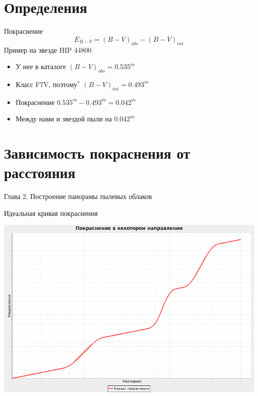 \documentclass[14pt, fleqn, xcolor={dvipsnames, table}]{beamer}
\begin{document}
    \section{Определения}
        \begin{frame}{Покраснение}
            $$
                E_{B - V} = (B - V)_{obs} - (B - V)_{int}
            $$
            Пример на звезде HIP 44800
            \begin{itemize}
                \item У нее в каталоге $(B - V)_{obs} = 0.535^m$
                \item Класс F7V, поэтому$^*$ $(B - V)_{int} = 0.493^m$
                \item Покраснение $0.535^m - 0.493^m = 0.042^m$
                \item Между нами и звездой пыли на $0.042^m$
            \end{itemize}
        \end{frame}

    \section{Зависимость покраснения от расстояния}    
    
		\begin{frame}
            Глава 2. Построение панорамы пылевых облаков 
        \end{frame}		    
    
        \begin{frame}{Идеальная кривая покраснения}
            \begin{center}
                \includegraphics[scale=0.35]{ideal-1-no-tick.png}
            \end{center}             
        \end{frame}
        
\end{document}

